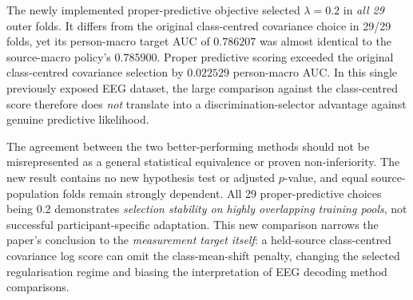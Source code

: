 The newly implemented proper-predictive objective selected
\(\lambda=0.2\) in \emph{all 29} outer folds. It differs from the
original class-centred covariance choice in 29/29 folds, yet its
person-macro target AUC of \(0.786207\) was almost identical
to the source-macro policy's \(0.785900\). Proper predictive
scoring exceeded the original class-centred covariance
selection by \(0.022529\) person-macro AUC. In this
single previously exposed EEG dataset, the large comparison
against the class-centred score therefore does
\emph{not} translate into a discrimination-selector advantage
against genuine predictive likelihood.

The agreement between the two better-performing methods
should not be misrepresented as a general statistical
equivalence or proven non-inferiority. The new result
contains no new hypothesis test or adjusted $p$-value,
and equal source-population folds remain strongly dependent.
All 29 proper-predictive choices being 0.2 demonstrates
\emph{selection stability on highly overlapping training pools},
not successful participant-specific adaptation.
This new comparison narrows the paper's conclusion to
the \emph{measurement target itself}: a held-source
class-centred covariance log score can omit the
class-mean-shift penalty, changing the selected
regularisation regime and biasing the interpretation
of EEG decoding method comparisons.
